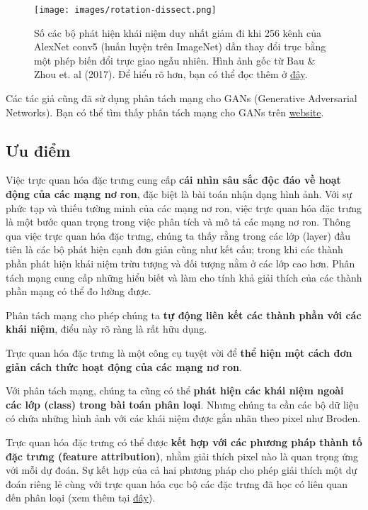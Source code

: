 \begin{figure*}[h!]
	\centering
	\texttt{[image: images/rotation-dissect.png]}
	\label{fig:7_10}
	\caption{Số các bộ phát hiện khái niệm duy nhất giảm đi khi 256 kênh của AlexNet conv5 (huấn luyện trên ImageNet) dần thay đổi trục bằng một phép biến đổi trực giao ngẫu nhiên. Hình ảnh gốc từ Bau $\&$ Zhou et. al (2017). Để hiểu rõ hơn, bạn có thể đọc thêm ở \href{http://openaccess.thecvf.com/content_cvpr_2017/papers/Bau_Network_Dissection_Quantifying_CVPR_2017_paper.pdf}{đây}.}
\end{figure*}

Các tác giả cũng đã sử dụng phân tách mạng cho GANs (Generative Adversarial Networks). Bạn có thể tìm thấy phân tách mạng cho GANs trên \href{https://gandissect.csail.mit.edu/}{website}.

\subsection{Ưu điểm}
Việc trực quan hóa đặc trưng cung cấp \textbf{cái nhìn sâu sắc độc đáo về hoạt động của các mạng nơ ron}, đặc biệt là bài toán nhận dạng hình ảnh. Với sự phức tạp và thiếu tường minh của các mạng nơ ron, việc trực quan hóa đặc trưng là một bước quan trọng trong việc phân tích và mô tả các mạng nơ ron. Thông qua việc trực quan hóa đặc trưng, chúng ta thấy rằng trong các lớp (layer) đầu tiên là các bộ phát hiện cạnh đơn giản cũng như kết cấu; trong khi các thành phần phát hiện khái niệm trừu tượng và đối tượng nằm ở các lớp cao hơn. Phân tách mạng cung cấp những hiểu biết và làm cho tính khả giải thích của các thành phần mạng có thể đo lường được.

Phân tách mạng cho phép chúng ta \textbf{tự động liên kết các thành phần với các khái niệm}, điểu này rõ ràng là rất hữu dụng. 

Trực quan hóa đặc trưng là một công cụ tuyệt vời để \textbf{thể hiện một cách đơn giản cách thức hoạt động của các mạng nơ ron}.

Với phân tách mạng, chúng ta cũng có thể \textbf{phát hiện các khái niệm ngoài các lớp (class) trong bài toán phân loại}. Nhưng chúng ta cần các bộ dữ liệu có chứa những hình ảnh với các khái niệm được gắn nhãn theo pixel như Broden.

Trực quan hóa đặc trưng có thể được \textbf{kết hợp với các phương pháp thành tố đặc trưng (feature attribution)}, nhằm giải thích pixel nào là quan trọng ứng với mỗi dự đoán. Sự kết hợp của cả hai phương pháp cho phép giải thích một dự đoán riêng lẻ cùng với trực quan hóa cục bộ các đặc trưng đã học có liên quan đến phân loại (xem thêm tại \href{https://distill.pub/2018/building-blocks/}{đây}).

